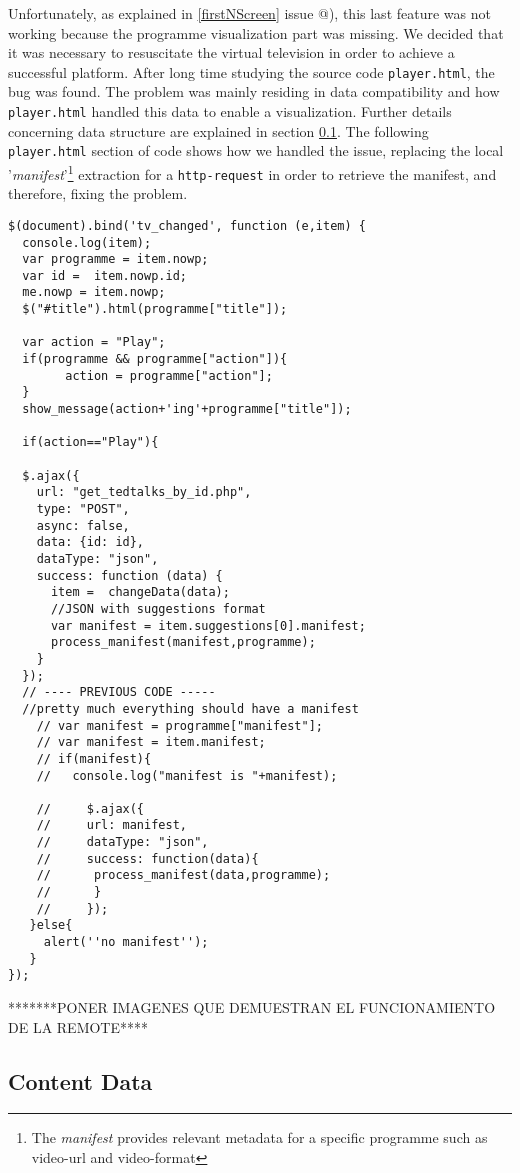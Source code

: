 \documentclass{acm_proc_article-sp}
\makeatletter
\newcommand*{\rom}[1]{\expandafter\@slowromancap\romannumeral #1@}
\makeatother
\begin{document}
Unfortunately, as explained in \ref{firstNScreen} issue \rom{4}), this last feature was not working because the programme visualization part was missing. We decided that it was necessary to resuscitate the virtual television in order to achieve a successful platform. After long time studying the source code \texttt{player.html}, the bug was found. The problem was mainly residing in data compatibility and how \texttt{player.html} handled this data to enable a visualization. Further details concerning data structure are explained in section \ref{data}. The following \texttt{player.html} section of code shows how we handled the issue, replacing the local '\textit{manifest}'\footnote{The \textit{manifest} provides relevant  metadata for a specific programme such as video-url and video-format} extraction for a \texttt{http-request} in order to retrieve the manifest, and therefore, fixing the problem. 
\begin{lstlisting}
$(document).bind('tv_changed', function (e,item) {
  console.log(item);
  var programme = item.nowp;
  var id =  item.nowp.id;
  me.nowp = item.nowp;
  $("#title").html(programme["title"]);

  var action = "Play";
  if(programme && programme["action"]){
        action = programme["action"];
  }  
  show_message(action+'ing'+programme["title"]);

  if(action=="Play"){

  $.ajax({
    url: "get_tedtalks_by_id.php",
    type: "POST",
    async: false,
    data: {id: id},
    dataType: "json",
    success: function (data) {
      item =  changeData(data); 
      //JSON with suggestions format
      var manifest = item.suggestions[0].manifest;
      process_manifest(manifest,programme);
    }
  });
  // ---- PREVIOUS CODE -----
  //pretty much everything should have a manifest
    // var manifest = programme["manifest"];
    // var manifest = item.manifest;
    // if(manifest){
    //   console.log("manifest is "+manifest);
  
    //     $.ajax({
    //     url: manifest,
    //     dataType: "json",
    //     success: function(data){
    //      process_manifest(data,programme);
    //      }
    //     }); 
   }else{
     alert(''no manifest'');
   }
});
\end{lstlisting}

*******PONER IMAGENES QUE DEMUESTRAN EL FUNCIONAMIENTO DE LA REMOTE****
\subsection{Content Data} \label{data}
\end{document}
